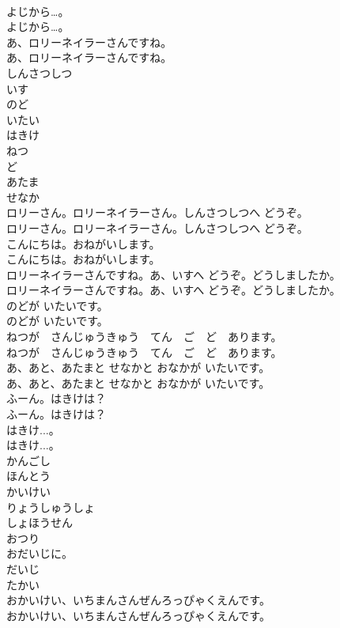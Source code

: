 \documentclass[8pt]{extreport}
\begin{document}
\begin{CJK}{UTF8}{min}
\\	よじから…。	
\\	よじから…。 
\\	あ、ロリーネイラーさんですね。	
\\	あ、ロリーネイラーさんですね。 
\\	しんさつしつ
\\	いす
\\	のど
\\	いたい
\\	はきけ
\\	ねつ
\\	ど
\\	あたま
\\	せなか
\\	ロリーさん。ロリーネイラーさん。しんさつしつへ どうぞ。	
\\	ロリーさん。ロリーネイラーさん。しんさつしつへ どうぞ。 
\\	こんにちは。おねがいします。	
\\	こんにちは。おねがいします。 
\\	ロリーネイラーさんですね。あ、いすへ どうぞ。どうしましたか。	
\\	ロリーネイラーさんですね。あ、いすへ どうぞ。どうしましたか。 
\\	のどが いたいです。	
\\	のどが いたいです。 
\\	ねつが　さんじゅうきゅう　てん　ご　ど　あります。	
\\	ねつが　さんじゅうきゅう　てん　ご　ど　あります。 
\\	あ、あと、あたまと せなかと おなかが いたいです。	
\\	あ、あと、あたまと せなかと おなかが いたいです。 
\\	ふーん。はきけは？	
\\	ふーん。はきけは？ 
\\	はきけ...。	
\\	はきけ...。 
\\	かんごし
\\	ほんとう
\\	かいけい
\\	りょうしゅうしょ
\\	しょほうせん
\\	おつり
\\	おだいじに。
\\	だいじ
\\	たかい
\\	おかいけい、いちまんさんぜんろっぴゃくえんです。	
\\	おかいけい、いちまんさんぜんろっぴゃくえんです。 

\end{CJK}
\end{document}
